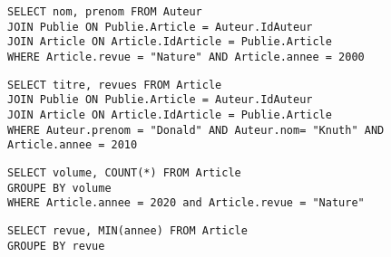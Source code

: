 \documentclass[11pt,a4paper]{article}
\begin{document}
\begin{Exercise}[title = {Base de données de publications scientifiques}]
	\ifcorrige
    \begin{verbatim}
SELECT nom, prenom FROM Auteur 
JOIN Publie ON Publie.Article = Auteur.IdAuteur
JOIN Article ON Article.IdArticle = Publie.Article
WHERE Article.revue = "Nature" AND Article.annee = 2000
    \end{verbatim}
	\fi
	\ifcorrige
    \begin{verbatim}
SELECT titre, revues FROM Article 
JOIN Publie ON Publie.Article = Auteur.IdAuteur
JOIN Article ON Article.IdArticle = Publie.Article
WHERE Auteur.prenom = "Donald" AND Auteur.nom= "Knuth" AND Article.annee = 2010
    \end{verbatim}
	\fi
	\ifcorrige
    \begin{verbatim}
SELECT volume, COUNT(*) FROM Article 
GROUPE BY volume
WHERE Article.annee = 2020 and Article.revue = "Nature"
    \end{verbatim}
	\fi
	\ifcorrige
    \begin{verbatim}
SELECT revue, MIN(annee) FROM Article 
GROUPE BY revue
    \end{verbatim}
	\fi
\end{Exercise}
\end{document}
